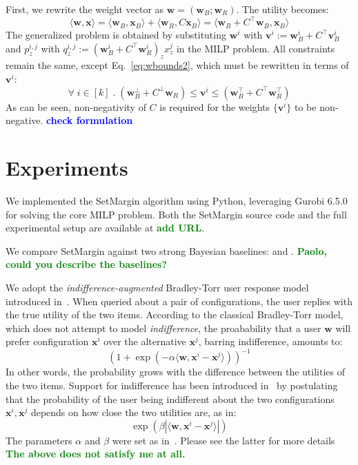 \documentclass{article}
\renewcommand\[{\begin{equation}}
\renewcommand\]{\end{equation}}
\newcommand{\vecvar}[1]{\ensuremath{\boldsymbol{#1}}}
\newcommand{\vv}{\vecvar{v}}
\newcommand{\vw}{\vecvar{w}}
\newcommand{\vx}{\vecvar{x}}
\newcommand{\andrea}[1]{{\bf \textcolor{blue}{{\fbox{Andrea:} #1}}}}
\newcommand{\stefano}[1]{{\bf \textcolor{green}{{\fbox{Stefano:} #1}}}}
\begin{document}
First, we rewrite the weight vector as $\vw = (\vw_B;\vw_R)$. The utility
becomes:
%
$$ \langle \vw, \vx \rangle = \langle \vw_B, \vx_B \rangle + \langle \vw_R, C \vx_B \rangle = \langle \vw_B + C^\top \vw_B, \vx_B \rangle $$
%
The generalized problem is obtained by substituting $\vw^i$ with $\vv^i := \vw_B^i + C^\top \vv_B^i$ and $p^{i,j}_z$
with $q^{i,j}_z := (\vw^i_B + C^\top \vw^i_R)_z x^j_z$ in the MILP problem.
All constraints remain the same, except Eq.~\ref{eq:wbounds2}, which must be
rewritten in terms of $\vv^i$:
%
$$ \forall \; i \in [k] \;.\; (\vw_B^\bot + C^\bot \vw_R) \le \vv^i \le (\vw_B^\top + C^\top \vw_R^\top)$$
%
As can be seen, non-negativity of $C$ is required for the weights $\{\vv^i\}$
to be non-negative. \andrea{check formulation}

\section{Experiments}
\label{sec:experiments}

We implemented the {\sc SetMargin} algorithm using Python, leveraging Gurobi
6.5.0 for solving the core MILP problem. Both the {\sc SetMargin} source code
and the full experimental setup are available at \stefano{add URL}.

We compare {\sc SetMargin} against two strong Bayesian baselines:
\cite{guo2010real} and \cite{viappiani2010optimal}.
\stefano{Paolo, could you describe the baselines?}

We adopt the {\em indifference-augmented} Bradley-Torr user response model
introduced in~\cite{guo2010real}. When queried about a pair of configurations,
the user replies with the true utility of the two items. According to the
classical Bradley-Torr model, which does not attempt to model {\em indifference},
the proabability that a user $\vw$ will prefer configuration $\vx^i$ over
the alternative $\vx^j$, barring indifference, amounts to:
%
$$ (1 + \exp(-\alpha \langle\vw,\vx^i - \vx^j\rangle))^{-1} $$
%
In other words, the probability grows with the difference between the utilities
of the two items. Support for indifference has been introduced
in~\cite{guo2010real} by postulating that the probability of the user being
indifferent about the two configurations $\vx^i, \vx^j$ depends on how close
the two utilities are, as in:
%
$$ \exp(\beta |\langle\vw,\vx^i - \vx^j\rangle|) $$
%
The parameters $\alpha$ and $\beta$ were set as in~\cite{guo2010real}. Please
see the latter for more details
\stefano{The above does not satisfy me at all.}
\end{document}
